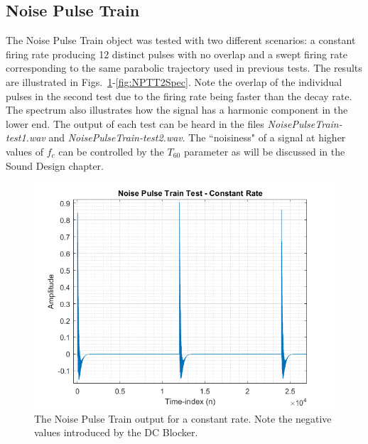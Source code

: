 \documentclass[../main.tex]{subfiles}
\begin{document}
\subsection{Noise Pulse Train}
The Noise Pulse Train object was tested with two different scenarios: a constant firing rate producing 12 distinct pulses with no overlap and a swept firing rate corresponding to the same parabolic trajectory used in previous tests. The results are illustrated in Figs.~\ref{fig:NPTT1}-\ref{fig:NPTT2Spec}. Note the overlap of the individual pulses in the second test due to the firing rate being faster than the decay rate. The spectrum also illustrates how the signal has a harmonic component in the lower end. The output of each test can be heard in the files \emph{NoisePulseTrain-test1.wav} and \emph{NoisePulseTrain-test2.wav}. The ``noisiness" of a signal at higher values of $f_c$ can be controlled by the $T_{60}$ parameter as will be discussed in the Sound Design chapter.

\begin{figure}[h!]
    \centering
    \includegraphics[scale=.45]{./images/plots/NPTTest1.png}
    \caption{The Noise Pulse Train output for a constant rate. Note the negative values introduced by the DC Blocker.}
    \label{fig:NPTT1}
\end{figure}
\end{document}
